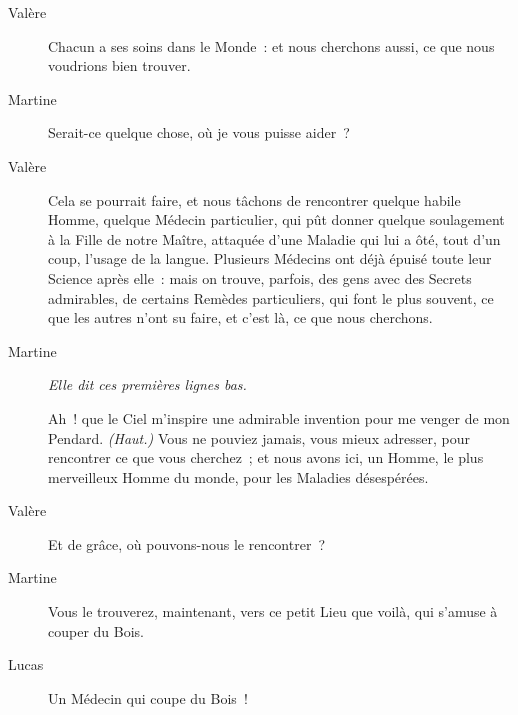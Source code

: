 \documentclass[french,twoside]{book} %
\begin{document}
 \begin{description} \item[Valère] 

Chacun a ses soins dans le Monde : et nous cherchons aussi, ce que nous voudrions bien trouver.\end{description}
 \begin{description} \item[Martine] 

Serait-ce quelque chose, où je vous puisse aider ?\end{description}
 \begin{description} \item[Valère] 

Cela se pourrait faire, et nous tâchons de rencontrer quelque habile Homme, quelque Médecin particulier, qui pût donner quelque soulagement à la Fille de notre Maître, attaquée d’une Maladie qui lui a ôté, tout d’un coup, l’usage de la langue. Plusieurs Médecins ont déjà épuisé toute leur Science après elle : mais on trouve, parfois, des gens avec des Secrets admirables, de certains Remèdes particuliers, qui font le plus souvent, ce que les autres n’ont su faire, et c’est là, ce que nous cherchons.\end{description}
 \begin{description} \item[Martine] \textit{Elle dit ces premières lignes bas.} 

Ah ! que le Ciel m’inspire une admirable invention pour me venger de mon Pendard. \textit{(Haut.)} Vous ne pouviez jamais, vous mieux adresser, pour rencontrer ce que vous cherchez ; et nous avons ici, un Homme, le plus merveilleux Homme du monde, pour les Maladies désespérées.\end{description}
 \begin{description} \item[Valère] 

Et de grâce, où pouvons-nous le rencontrer ?\end{description}
 \begin{description} \item[Martine] 

Vous le trouverez, maintenant, vers ce petit Lieu que voilà, qui s’amuse à couper du Bois.\end{description}
 \begin{description} \item[Lucas] 

Un Médecin qui coupe du Bois !\end{description}
\end{document}
